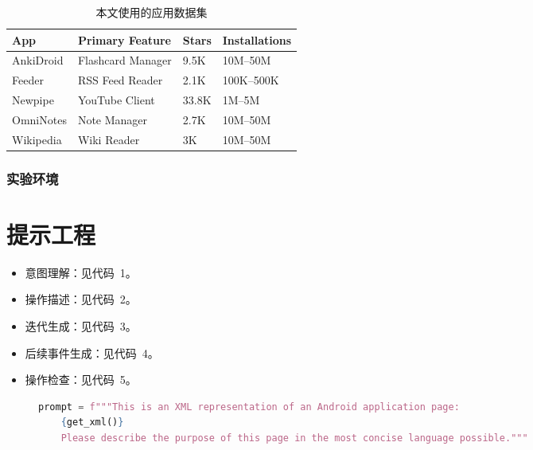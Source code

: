 \documentclass[twocolumn, 10pt]{article}
\begin{document}
\begin{table}[t]
\small
\centering
\caption{本文使用的应用数据集}
\label{tab:app-dataset}
\begin{tabular}{@{}llll@{}}
\toprule
\textbf{App}    & \textbf{Primary Feature}        & \textbf{Stars} & \textbf{Installations} \\ 
\midrule
AnkiDroid   & Flashcard Manager     & 9.5K         & 10M–50M       \\
Feeder      & RSS Feed Reader        & 2.1K         & 100K–500K     \\
Newpipe     & YouTube Client         & 33.8K        & 1M–5M         \\
OmniNotes   & Note Manager           & 2.7K         & 10M–50M       \\
Wikipedia   & Wiki Reader    & 3K           & 10M–50M       \\
\bottomrule
\end{tabular}
\end{table}


\subsubsection{实验环境}




\appendix

\section{提示工程}
\label{sec:prompt}

\begin{itemize}
    \item 意图理解：见代码~1。
    \item 操作描述：见代码~2。
    \item 迭代生成：见代码~3。
    \item 后续事件生成：见代码~4。
    \item 操作检查：见代码~5。
\end{itemize}

\begin{figure}[t]
\centering
\begin{lstlisting}[language=Python,caption=意图理解]
    prompt = f"""This is an XML representation of an Android application page:
    {get_xml()}
    Please describe the purpose of this page in the most concise language possible."""
\end{lstlisting}
\label{fig:intent}
\end{figure}
\end{document}
